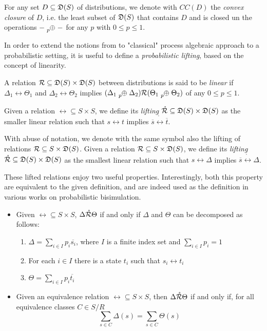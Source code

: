 For any set $D \subseteq \mathfrak{D}(S)$ of distributions, we denote with $CC(D)$ the \textit{convex closure} of $D$, i.e. the least subset of $\mathfrak{D}(S)$ that contains $D$ and is closed un the operations $ - \psum{p} - $ for any $p$ with $0 \leq p \leq 1$.


In order to extend the notions from to "classical" process algebraic approach to a probabilistic setting, it is useful to define a \textit{probabilistic lifting}, based on the concept of linearity.

A relation $\mathcal{R} \subseteq \mathfrak{D}(S) \times \mathfrak{D}(S)$  between distributions is said to be \textit{linear} if $\Delta_1 \rel \Theta_1$ and $\Delta_2 \rel \Theta_2$ implies $(\Delta_1 \psum{p} \Delta_2) \rel (\Theta_1 \psum{p} \Theta_2)$ of any $0 \leq p \leq 1$.

Given a relation $\rel \subseteq S \times S$, we define its \textit{lifting} $\mathring{\mathcal{R}} \subseteq \mathfrak{D}(S) \times \mathfrak{D}(S)$ as the smaller linear relation such that $s \rel t$ implies $\overline{s} \mathring{\rel} \overline{t}$.

With abuse of notation, we denote with the same symbol also the lifting of relations $\mathcal{R} \subseteq S \times \mathfrak{D}(S)$. Given a relation $\mathcal{R} \subseteq S \times \mathfrak{D}(S)$, we define its \textit{lifting} $\mathring{\mathcal{R}} \subseteq \mathfrak{D}(S) \times \mathfrak{D}(S)$ as the smallest linear relation such that $s \rel \Delta$ implies $\overline{s} \mathring{\rel} \Delta$.


These lifted relations enjoy two useful properties. Interestingly, both this property are equivalent to the given definition, and are indeed used as the definition in various works on probabilistic bisimulation. \begin{itemize}
\item Given $\rel \subseteq S \times S$, $\Delta \mathring{\mathcal{R}} \Theta$ if and only if $\Delta$ and $\Theta$ can be decomposed as follows: \begin{enumerate}
\item $\Delta = \sum_{i \in I} p_i \overline{s_i}$, where $I$ is a finite index set and $\sum_{i \in I}p_i = 1$
\item For each $i \in I$ there is a state $t_i$ such that $s_i \rel t_i$
\item $\Theta = \sum_{i\in I}p_i\overline{t_i}$ 
\end{enumerate}
\item Given an equivalence relation $\rel \subseteq S \times S$, then $\Delta \mathring{\mathcal{R}} \Theta$ if and only if, for all equivalence classes $C \in S/R$
\[\sum_{s\in C} \Delta(s) = \sum_{s\in C} \Theta(s)\]
\end{itemize}

